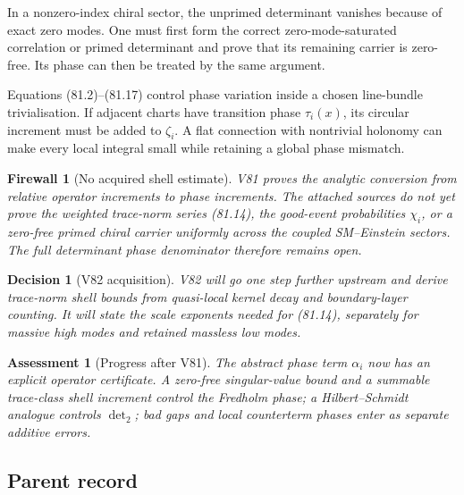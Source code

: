 \documentclass[11pt]{article}
\newtheorem{assessment}[theorem]{Assessment}
\newtheorem{firewall}[theorem]{Firewall}
\newtheorem{decision}[theorem]{Decision}
\begin{document}
In a nonzero-index chiral sector, the unprimed determinant vanishes
because of exact zero modes.  One must first form the correct
zero-mode-saturated correlation or primed determinant and prove that
its remaining carrier is zero-free.  Its phase can then be treated by
the same argument.

\begin{warning}
\label{warn:v11v81-holonomy}
Equations (81.2)--(81.17) control phase variation inside a chosen
line-bundle trivialisation.  If adjacent charts have transition phase
\(\tau_i(x)\), its circular increment must be added to \(\zeta_i\).
A flat connection with nontrivial holonomy can make every local
integral small while retaining a global phase mismatch.
\end{warning}

\begin{firewall}[No acquired shell estimate]
\label{fire:v11v81-boundary}
V81 proves the analytic conversion from relative operator increments
to phase increments.  The attached sources do not yet prove the
weighted trace-norm series (81.14), the good-event probabilities
\(\chi_i\), or a zero-free primed chiral carrier uniformly across the
coupled SM--Einstein sectors.  The full determinant phase denominator
therefore remains open.
\end{firewall}

\begin{decision}[V82 acquisition]
\label{dec:v11v81-next}
V82 will go one step further upstream and derive trace-norm shell
bounds from quasi-local kernel decay and boundary-layer counting.
It will state the scale exponents needed for (81.14), separately for
massive high modes and retained massless low modes.
\end{decision}

\begin{assessment}[Progress after V81]
\label{ass:v11v81-status}
The abstract phase term \(\alpha_i\) now has an explicit operator
certificate.  A zero-free singular-value bound and a summable
trace-class shell increment control the Fredholm phase; a
Hilbert--Schmidt analogue controls \(\det_2\); bad gaps and local
counterterm phases enter as separate additive errors.
\end{assessment}

\subsection{Parent record}
\end{document}
